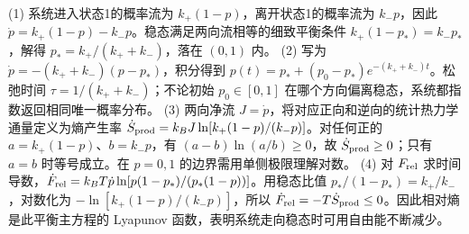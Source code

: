 (1) 系统进入状态1的概率流为 \(k_+(1-p)\)，离开状态1的概率流为 \(k_-p\)，因此 \(\dot p=k_+(1-p)-k_-p\)。稳态满足两向流相等的细致平衡条件 \(k_+(1-p_*)=k_-p_*\)，解得 \(p_*=k_+/(k_++k_-)\)，落在 \((0,1)\) 内。
(2) 写为 \(\dot p=-(k_++k_-)(p-p_*)\)，积分得到 \(p(t)=p_*+(p_0-p_*)e^{-(k_++k_-)t}\)。松弛时间 \(\tau=1/(k_++k_-)\)；不论初始 \(p_0\in[0,1]\) 在哪个方向偏离稳态，系统都指数返回相同唯一概率分布。
(3) 两向净流 \(J=\dot p\)，将对应正向和逆向的统计热力学通量定义为熵产生率 \(\dot S_{\rm prod}=k_BJ\ln[k_+(1-p)/(k_-p)]\)。对任何正的 \(a=k_+(1-p)\)、\(b=k_-p\)，有 \((a-b)\ln(a/b)\ge0\)，故 \(\dot S_{\rm prod}\ge0\)；只有 \(a=b\) 时等号成立。在 \(p=0,1\) 的边界需用单侧极限理解对数。
(4) 对 \(F_{\rm rel}\) 求时间导数，\(\dot F_{\rm rel}=k_BT\dot p\ln[p(1-p_*)/(p_*(1-p))]\)。用稳态比值 \(p_*/(1-p_*)=k_+/k_-\)，对数化为 \(-\ln[k_+(1-p)/(k_-p)]\)，所以 \(\dot F_{\rm rel}=-T\dot S_{\rm prod}\le0\)。因此相对熵是此平衡主方程的 Lyapunov 函数，表明系统走向稳态时可用自由能不断减少。
